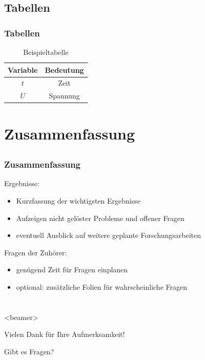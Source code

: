 \documentclass{beamer}
\begin{document}
\subsection{Tabellen}

\begin{frame}
	\frametitle<presentation>{Tabellen}
	\begin{table}
		\caption{Beispieltabelle}
		\label{tab:beispiel}
		\centering
			\begin{tabular}{cc}
				\toprule
				Variable & Bedeutung \\
				\midrule
				$t$ & Zeit \\
				$U$ & Spannung \\
				\bottomrule
			\end{tabular}
	\end{table}
\end{frame}

\section{Zusammenfassung}

\subsection*{}

\begin{frame}
	\frametitle<presentation>{Zusammenfassung}
	\begin{block}{Ergebnisse:}
	  \begin{itemize}
	  	\item Kurzfassung der wichtigsten Ergebnisse
	  	\item Aufzeigen nicht gelöster Probleme und offener Fragen
	  	\item eventuell Ausblick auf weitere geplante Forschungsarbeiten
		\end{itemize}
	\end{block}
	\begin{block}{Fragen der Zuhörer:}
	 \begin{itemize}
	 	\item genügend Zeit für Fragen einplanen
	 	\item optional: zusätzliche Folien für wahrscheinliche Fragen
	 \end{itemize}
	\end{block}	
\end{frame}

\section*{}

\begin{frame}<beamer>{}
	\begin{center}
		Vielen Dank für Ihre Aufmerksamkeit!
	\end{center}
	\begin{center}
		Gibt es Fragen?
	\end{center}
\end{frame}
\end{document}
